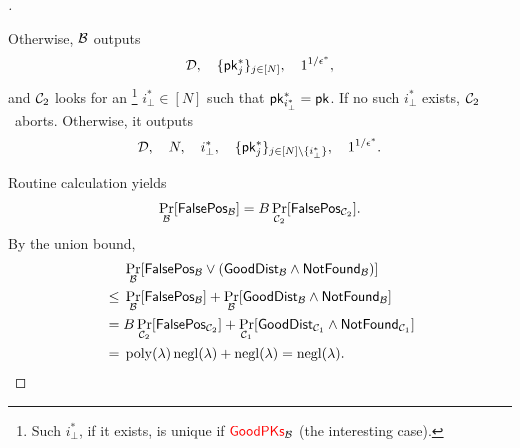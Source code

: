 \begin{proof}[]
\begin{itemize}
Otherwise, ${\mathcal{B}}$ outputs
\begin{align*}
\scriptD,\quad
\{\pk_j^\ast\}_{j\in[N]},\quad
1^{1/\epsilon^\ast},
\end{align*}
and ${\mathcal{C}}_2$ looks for an%
\footnote{Such $i_\bot^\ast$, if it exists, is unique if $\GoodPKs_\scriptB$
(the interesting case).}
${i_\bot^\ast\in[N]}$ such that ${\pk_{i_\bot^\ast}^\ast=\pk}$.
If no such $i_\bot^\ast$ exists, ${\mathcal{C}}_2$~aborts.
Otherwise, it outputs
\begin{align*}
\scriptD,\quad
N,\quad
i_\bot^\ast,\quad
\{\pk_j^\ast\}_{j\in{[N]\setminus{\{i_\bot^\ast\}}}},\quad
1^{1/\epsilon^\ast}.
\end{align*}
\end{itemize}
Routine calculation yields
\begin{align*}
\Pr_\scriptB[\FalsePos_\scriptB]
=
B\Pr_{\scriptC_2}[\FalsePos_{\scriptC_2}].
\end{align*}
By the union bound,
\begin{align*}
&
\Pr_\scriptB[\FalsePos_\scriptB\vee(\GoodDist_\scriptB\wedge\NotFound_\scriptB)]
\\{}\leq{}&
\Pr_\scriptB[\FalsePos_\scriptB]
+
\Pr_\scriptB[\GoodDist_\scriptB\wedge\NotFound_\scriptB]
\\{}={}&
B\Pr_{\scriptC_2}[\FalsePos_{\scriptC_2}]
+
\Pr_{\scriptC_1}[\GoodDist_{\scriptC_1}\wedge\NotFound_{\scriptC_1}]
\WideNarrow{}{\hspace*{-1em}}
\\{}={}&
\poly(\lambda)\negl(\lambda)+\negl(\lambda)
=
\negl(\lambda).
\qedhere
\end{align*}
\end{proof}
